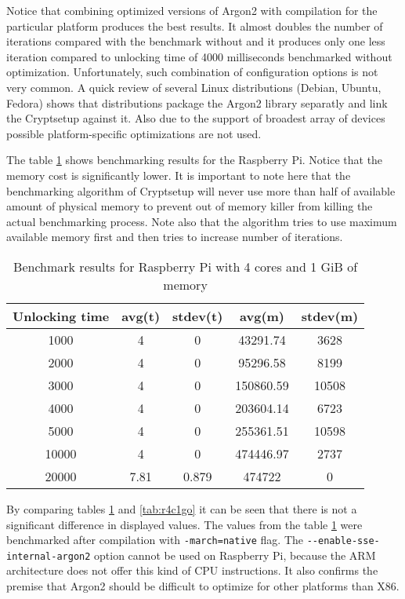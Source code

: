 \documentclass[nolof]{fithesis3}
\begin{document}
Notice that combining optimized versions of Argon2 with compilation for the particular platform produces the best results. It almost doubles the number of iterations compared with the benchmark without and it produces only one less iteration compared to unlocking time of 4000 milliseconds benchmarked without optimization. Unfortunately, such combination of configuration options is not very common. A quick review of several Linux distributions (Debian, Ubuntu, Fedora) shows that distributions package the Argon2 library separatly and link the Cryptsetup against it. Also due to the support of broadest array of devices possible platform-specific optimizations are not used.

The table \ref{tab:r4c1g} shows benchmarking results for the Raspberry Pi.  Notice that the memory cost is significantly lower. It is important to note here that the benchmarking algorithm of Cryptsetup will never use more than half of available amount of physical memory to prevent out of memory killer from killing the actual benchmarking process. Note also that the algorithm tries to use maximum available memory first and then tries to increase number of iterations.

\noindent
\begin{table}
\caption{Benchmark results for Raspberry Pi with 4 cores and 1 GiB of memory}
\label{tab:r4c1g}
\begin{tabularx}{\textwidth}{| c | c | c | c | c |}
\hline
Unlocking time & avg(t) & stdev(t) & avg(m) & stdev(m)\\
\hline
1000 & 4 & 0 & 43291.74 & 3628\\
\hline
2000 & 4 & 0 & 95296.58 & 8199\\
\hline
3000 & 4 & 0 & 150860.59 & 10508\\
\hline
4000 & 4 & 0 & 203604.14 & 6723\\
\hline
5000 & 4 & 0 & 255361.51 & 10598\\
\hline
10000 & 4 & 0 & 474446.97 & 2737\\
\hline
20000 & 7.81 & 0.879 & 474722 & 0\\
\hline
\end{tabularx}
\end{table}

By comparing tables \ref{tab:r4c1g} and \ref{tab:r4c1go} it can be seen that there is not a significant difference in displayed values. The values from the table \ref{tab:r4c1g} were benchmarked after compilation with \verb+-march=native+ flag. The \verb+--enable-sse-internal-argon2+ option cannot be used on Raspberry Pi, because the ARM architecture does not offer this kind of CPU instructions. It also confirms the premise that Argon2 should be difficult to optimize for other platforms than X86.
\end{document}
